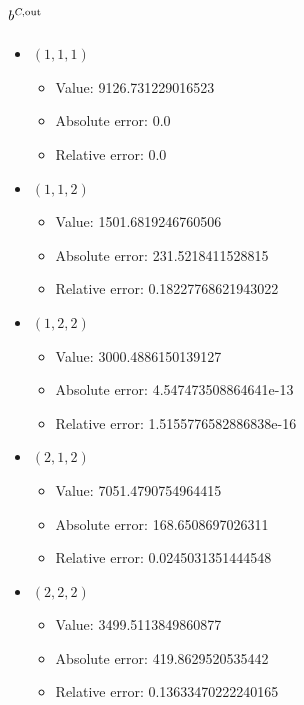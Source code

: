 \documentclass{article}%
\begin{document}
\subsection{$b^{\textsl{C},\text{out}}$}%
\begin{itemize}%
	\item $(1, 1, 1)$%
	\begin{itemize}%
		\item Value: 9126.731229016523%
		\item Absolute error: 0.0%
		\item Relative error: 0.0%
	\end{itemize}%
	\item $(1, 1, 2)$%
	\begin{itemize}%
		\item Value: 1501.6819246760506%
		\item Absolute error: 231.5218411528815%
		\item Relative error: 0.18227768621943022%
	\end{itemize}%
	\item $(1, 2, 2)$%
	\begin{itemize}%
		\item Value: 3000.4886150139127%
		\item Absolute error: 4.547473508864641e-13%
		\item Relative error: 1.5155776582886838e-16%
	\end{itemize}%
	\item $(2, 1, 2)$%
	\begin{itemize}%
		\item Value: 7051.4790754964415%
		\item Absolute error: 168.6508697026311%
		\item Relative error: 0.0245031351444548%
	\end{itemize}%
	\item $(2, 2, 2)$%
	\begin{itemize}%
		\item Value: 3499.5113849860877%
		\item Absolute error: 419.8629520535442%
		\item Relative error: 0.13633470222240165%
	\end{itemize}%
\end{itemize}%
\end{document}
